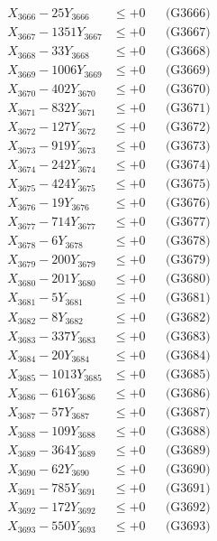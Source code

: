 \documentclass[a4paper,10pt]{article}
\begin{document}
{\begin{align}
X_{3666} - 25Y_{3666} &\leq +0 && \text{(G3666)} \\
X_{3667} - 1351Y_{3667} &\leq +0 && \text{(G3667)} \\
X_{3668} - 33Y_{3668} &\leq +0 && \text{(G3668)} \\
X_{3669} - 1006Y_{3669} &\leq +0 && \text{(G3669)} \\
X_{3670} - 402Y_{3670} &\leq +0 && \text{(G3670)} \\
\allowbreak
X_{3671} - 832Y_{3671} &\leq +0 && \text{(G3671)} \\
X_{3672} - 127Y_{3672} &\leq +0 && \text{(G3672)} \\
X_{3673} - 919Y_{3673} &\leq +0 && \text{(G3673)} \\
X_{3674} - 242Y_{3674} &\leq +0 && \text{(G3674)} \\
X_{3675} - 424Y_{3675} &\leq +0 && \text{(G3675)} \\
X_{3676} - 19Y_{3676} &\leq +0 && \text{(G3676)} \\
X_{3677} - 714Y_{3677} &\leq +0 && \text{(G3677)} \\
X_{3678} - 6Y_{3678} &\leq +0 && \text{(G3678)} \\
X_{3679} - 200Y_{3679} &\leq +0 && \text{(G3679)} \\
X_{3680} - 201Y_{3680} &\leq +0 && \text{(G3680)} \\
\allowbreak
X_{3681} - 5Y_{3681} &\leq +0 && \text{(G3681)} \\
X_{3682} - 8Y_{3682} &\leq +0 && \text{(G3682)} \\
X_{3683} - 337Y_{3683} &\leq +0 && \text{(G3683)} \\
X_{3684} - 20Y_{3684} &\leq +0 && \text{(G3684)} \\
X_{3685} - 1013Y_{3685} &\leq +0 && \text{(G3685)} \\
X_{3686} - 616Y_{3686} &\leq +0 && \text{(G3686)} \\
X_{3687} - 57Y_{3687} &\leq +0 && \text{(G3687)} \\
X_{3688} - 109Y_{3688} &\leq +0 && \text{(G3688)} \\
X_{3689} - 364Y_{3689} &\leq +0 && \text{(G3689)} \\
X_{3690} - 62Y_{3690} &\leq +0 && \text{(G3690)} \\
\allowbreak
X_{3691} - 785Y_{3691} &\leq +0 && \text{(G3691)} \\
X_{3692} - 172Y_{3692} &\leq +0 && \text{(G3692)} \\
X_{3693} - 550Y_{3693} &\leq +0 && \text{(G3693)} \\

\end{align}}
\end{document}
